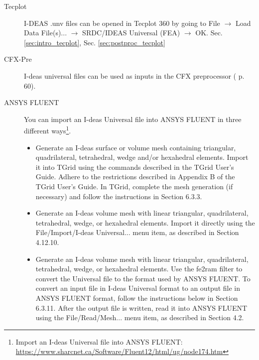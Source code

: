 \begin{description}
\item[Tecplot] I-DEAS .unv files can be opened in Tecplot 360 by going to File
$\rightarrow$ Load  Data File(s)...  $\rightarrow$  SRDC/IDEAS Universal (FEA)
$\rightarrow$           OK.            Sec.           \ref{sec:intro_tecplot},
Sec. \ref{sec:postproc_tecplot}

\item[CFX-Pre]  I-deas  universal files  can  be used  as  inputs  in the  CFX
preprocessor (\cite{CFXPreUG2009} p. 60).

\item[ANSYS FLUENT] You can import  an I-deas Universal file into ANSYS FLUENT
in three  different ways\footnote{Import an  I-deas Universal file  into ANSYS
FLUENT: \url{https://www.sharcnet.ca/Software/Fluent12/html/ug/node174.htm}}.

\begin{itemize}
\item  Generate  an  I-deas  surface  or volume  mesh  containing  triangular,
quadrilateral, tetrahedral,  wedge and/or hexahedral elements.  Import it into
TGrid using  the commands described in  the TGrid User's Guide.  Adhere to the
restrictions  described in Appendix  B of  the TGrid  User's Guide.  In TGrid,
complete the  mesh generation  (if necessary) and  follow the  instructions in
Section 6.3.3.

\item Generate  an I-deas volume  mesh with linear  triangular, quadrilateral,
tetrahedral,  wedge, or  hexahedral  elements. Import  it  directly using  the
File/Import/I-deas Universal... menu item, as described in Section 4.12.10.

\item Generate  an I-deas volume  mesh with linear  triangular, quadrilateral,
tetrahedral, wedge, or  hexahedral elements. Use the fe2ram  filter to convert
the Universal  file to the  format used by  ANSYS FLUENT. To convert  an input
file in  I-deas Universal  format to  an output file  in ANSYS  FLUENT format,
follow  the instructions below  in Section  6.3.11. After  the output  file is
written, read it  into ANSYS FLUENT using the  File/Read/Mesh... menu item, as
described in Section 4.2.
\end{itemize}


\end{description}

